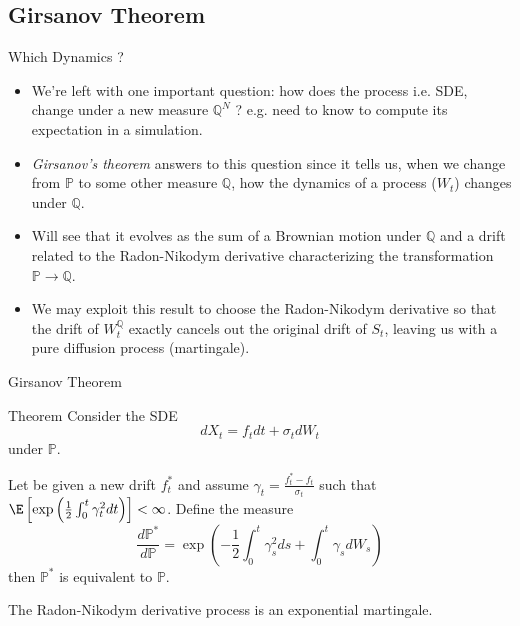 \documentclass{beamer}
\begin{document}
\subsection{Girsanov Theorem}
\begin{frame}{Which Dynamics ?}
	\begin{itemize}
		\item<1-> We're left with one important question:
		\textcolor{maincolor}{how does the process i.e. SDE, change under a new measure $\mathbb{Q}^N$ ?} e.g. need to know to compute its expectation in a simulation.
		\item<2-> \emph{Girsanov's theorem} answers to this question since it tells us, when we change from $\mathbb{P}$ to some other measure $\mathbb{Q}$, how the dynamics of a process ($W_t$) changes under $\mathbb{Q}$.
		\item<3-> Will see that it evolves as the sum of a Brownian motion under $\mathbb{Q}$ and a drift related to the Radon-Nikodym derivative characterizing the transformation $\mathbb{P}\rightarrow\mathbb{Q}$.
		\item<4-> We may exploit this result to choose the Radon-Nikodym derivative so that the drift of $W_t^\mathbb{Q}$ exactly cancels out the original drift of $S_t$, leaving us with a pure diffusion process (martingale).
	\end{itemize}
\end{frame}

\begin{frame}{Girsanov Theorem}
	\begin{block}{Theorem}
		Consider the SDE
		\begin{equation*}
			dX_t = f_t dt + \sigma_t dW_t
		\end{equation*}
		under $\mathbb{P}$.

		Let be given a new drift $f^*_t$ and assume $\gamma_t=\frac{f_t^*-f_t}{\sigma_t}$ such that $\E\left[\exp\left(\frac{1}{2}\int_0^t\gamma_t^2dt\right)\right]<\infty$.
		Define the measure
		\begin{equation}
			\frac{d\mathbb{P}^*}{d\mathbb{P}}=\exp\left(-\frac{1}{2}\int_0^t \gamma_s^2 ds + \int_0^t \gamma_s dW_s \right)
		\end{equation}
		then $\mathbb{P}^*$ is equivalent to $\mathbb{P}$.

		The Radon-Nikodym derivative process is an \textcolor{maincolor}{exponential martingale}.
	\end{block}
\end{frame}
\end{document}
